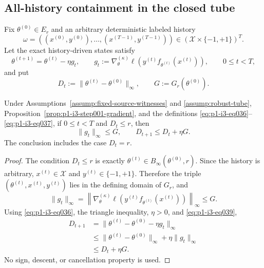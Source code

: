 \subsection{All-history containment in the closed tube}
\label{app:step002-containment}

Fix $\theta^{(0)}\in E_r$ and an arbitrary deterministic labeled history
\[
\omega=((x^{(0)},y^{(0)}),\ldots,(x^{(T-1)},y^{(T-1)}))
\in(\mathcal X\times\{-1,+1\})^T.
\]
Let the exact history-driven states satisfy
\[
\theta^{(t+1)}=\theta^{(t)}-\eta g_t,
\qquad
g_t:=\nabla_\theta^{(\kappa)}
\ell(y^{(t)}f_{\theta^{(t)}}(x^{(t)})),
\qquad0\leq t<T,
\tag{36}\label{eq:p1-i3-eq036}
\]
and put
\[
D_t:=\|\theta^{(t)}-\theta^{(0)}\|_\infty,
\qquad G:=G_r(\theta^{(0)}).
\tag{37}\label{eq:p1-i3-eq037}
\]

\begin{lemma}
\label{lem:p1-i3-step002-one-step}
Under Assumptions~\ref{assump:fixed-source-witnesses} and
\ref{assump:robust-tube}, Proposition~\ref{prop:p1-i3-step001-gradient},
and the definitions \eqref{eq:p1-i3-eq036}--\eqref{eq:p1-i3-eq037}, if $0\leq t<T$ and $D_t\leq r$, then
\[
\|g_t\|_\infty\leq G,
\qquad D_{t+1}\leq D_t+\eta G.
\tag{38}\label{eq:p1-i3-eq038}
\]
The conclusion includes the case $D_t=r$.
\end{lemma}

\begin{proof}
The condition $D_t\leq r$ is exactly
$\theta^{(t)}\in B_\infty(\theta^{(0)},r)$.  Since the history is arbitrary,
$x^{(t)}\in\mathcal X$ and $y^{(t)}\in\{-1,+1\}$.  Therefore the triple
$(\theta^{(t)},x^{(t)},y^{(t)})$ lies in the defining domain of $G_r$, and
\[
\|g_t\|_\infty
=\left\|\nabla_\theta^{(\kappa)}
\ell(y^{(t)}f_{\theta^{(t)}}(x^{(t)}))\right\|_\infty\leq G.
\tag{39}\label{eq:p1-i3-eq039}
\]
Using \eqref{eq:p1-i3-eq036}, the triangle inequality, $\eta>0$, and \eqref{eq:p1-i3-eq039},
\[
\begin{aligned}
D_{t+1}
&=\|\theta^{(t)}-\theta^{(0)}-\eta g_t\|_\infty\\
&\leq\|\theta^{(t)}-\theta^{(0)}\|_\infty+\eta\|g_t\|_\infty\\
&\leq D_t+\eta G.
\end{aligned}
\tag{40}\label{eq:p1-i3-eq040}
\]
No sign, descent, or cancellation property is used.
\end{proof}

